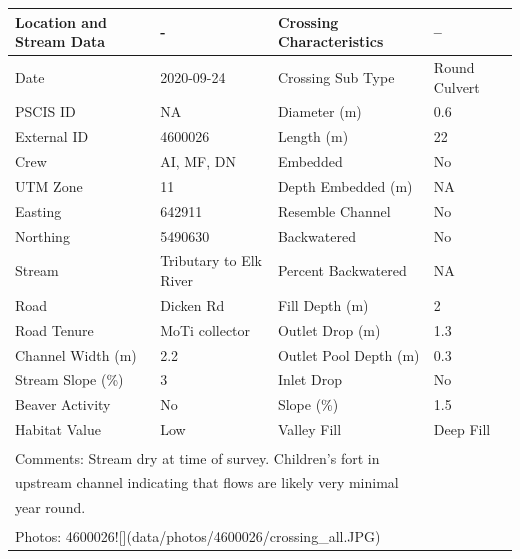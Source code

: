 \documentclass[
]{book}
\begin{document}
\begin{tabular}{llll}
\toprule
Location and Stream Data & - & Crossing Characteristics & --\\
\midrule
Date & 2020-09-24 & Crossing Sub Type & Round Culvert\\
PSCIS ID & NA & Diameter (m) & 0.6\\
External ID & 4600026 & Length (m) & 22\\
Crew & AI, MF, DN & Embedded & No\\
UTM Zone & 11 & Depth Embedded (m) & NA\\
\addlinespace
Easting & 642911 & Resemble Channel & No\\
Northing & 5490630 & Backwatered & No\\
Stream & Tributary to Elk River & Percent Backwatered & NA\\
Road & Dicken Rd & Fill Depth (m) & 2\\
Road Tenure & MoTi collector & Outlet Drop (m) & 1.3\\
\addlinespace
Channel Width (m) & 2.2 & Outlet Pool Depth (m) & 0.3\\
Stream Slope (\%) & 3 & Inlet Drop & No\\
Beaver Activity & No & Slope (\%) & 1.5\\
Habitat Value & Low & Valley Fill & Deep Fill\\
\bottomrule
\multicolumn{4}{l}{\textsuperscript{} Comments: Stream dry at time of survey.  Children’s fort in}\\
\multicolumn{4}{l}{upstream channel indicating that flows are likely very minimal}\\
\multicolumn{4}{l}{year round.}\\
\multicolumn{4}{l}{\textsuperscript{} Photos: 4600026![](data/photos/4600026/crossing\_all.JPG)}\\
\end{tabular}
\end{document}
